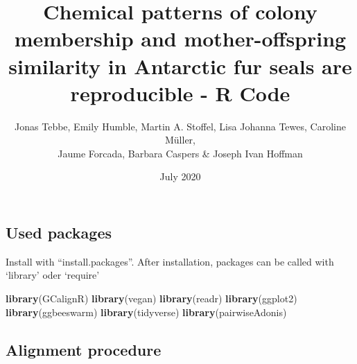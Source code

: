 \documentclass[]{article}
\title{Chemical patterns of colony membership and mother-offspring similarity
in Antarctic fur seals are reproducible - R Code}
\author{Jonas Tebbe, Emily Humble, Martin A. Stoffel, Lisa Johanna Tewes,
Caroline Müller,\\
Jaume Forcada, Barbara Caspers \& Joseph Ivan Hoffman}
\date{July 2020}
\newenvironment{Shaded}{\begin{snugshade}}{\end{snugshade}}
\newcommand{\KeywordTok}[1]{\textcolor[rgb]{0.13,0.29,0.53}{\textbf{#1}}}
\newcommand{\NormalTok}[1]{#1}
\begin{document}
\maketitle

\subsection{Used packages}\label{used-packages}

Install with ``install.packages''. After installation, packages can be
called with `library' oder `require'

\begin{Shaded}
\begin{Highlighting}[]
\KeywordTok{library}\NormalTok{(GCalignR)}
\KeywordTok{library}\NormalTok{(vegan)}
\KeywordTok{library}\NormalTok{(readr)}
\KeywordTok{library}\NormalTok{(ggplot2)}
\KeywordTok{library}\NormalTok{(ggbeeswarm)}
\KeywordTok{library}\NormalTok{(tidyverse)}
\KeywordTok{library}\NormalTok{(pairwiseAdonis)}
\end{Highlighting}
\end{Shaded}

\subsection{Alignment procedure}\label{alignment-procedure}
\end{document}
